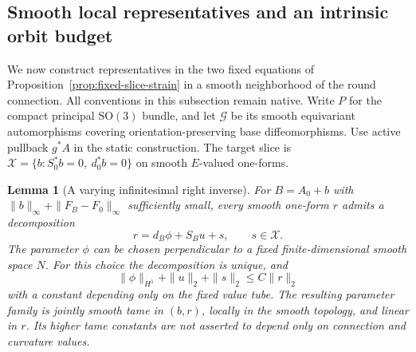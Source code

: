 \documentclass[11pt]{article}
\numberwithin{equation}{section}
\newtheorem{lemma}[theorem]{Lemma}
\theoremstyle{definition}
\theoremstyle{remark}
\begin{document}
\subsection{Smooth local representatives and an intrinsic orbit budget}
\label{subsec:smooth-orbit-slice}

We now construct representatives in the two fixed equations
of Proposition~\ref{prop:fixed-slice-strain} in a smooth
neighborhood of the round connection. All conventions in
this subsection remain native. Write $P$ for the compact
principal $\mathrm{SO}(3)$ bundle, and let $\mathscr G$
be its smooth equivariant automorphisms covering
orientation-preserving base diffeomorphisms. Use active
pullback $g^*A$ in the static construction.
The target slice is
$\mathcal X=\{b:S_0^*b=0,\ d_0^*b=0\}$ on smooth
$E$-valued one-forms.

\begin{lemma}[A varying infinitesimal right inverse]
\label{lem:varying-slice-inverse}
For $B=A_0+b$ with
$\|b\|_\infty+\|F_B-F_0\|_\infty$ sufficiently small,
every smooth one-form $r$ admits a decomposition
\[
 r=d_B\phi+S_Bu+s,\qquad s\in\mathcal X .
\]
The parameter $\phi$ can be chosen perpendicular to a
fixed finite-dimensional smooth space $N$.
For this choice the decomposition is unique, and
\[
 \|\phi\|_{H^1}+\|u\|_2+\|s\|_2\le C\|r\|_2
\]
with a constant depending only on the fixed value tube.
The resulting parameter family is jointly smooth tame
in $(b,r)$, locally in the smooth topology, and linear
in $r$. Its higher tame constants are not asserted to
depend only on connection and curvature values.
\end{lemma}
\end{document}

